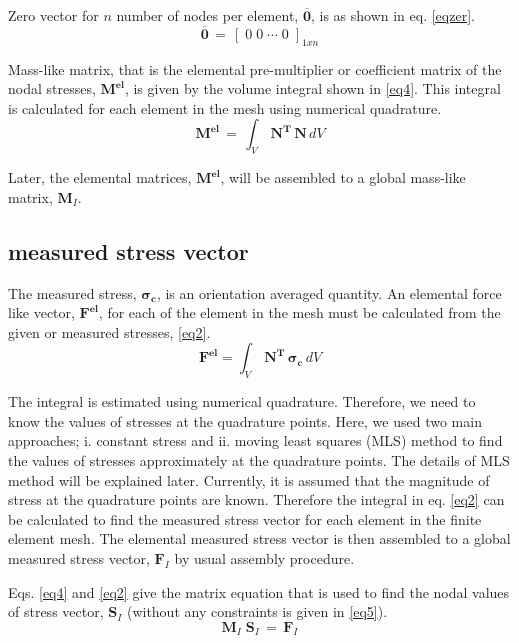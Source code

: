 \documentclass{article}
\begin{document}
Zero vector for $n$ number of nodes per element, $\mathbf{\mathbf{\overline{0}}}$, is as shown in eq. \eqref{eqzer}.
\begin{equation}
\mathbf{\mathbf{\overline{0}}} \,=\, \left[\; 0\; 0 \; \cdots\; 0\; \right]_{1xn}
\label{eqzer}
\end{equation}

Mass-like matrix, that is the elemental pre-multiplier or coefficient matrix of the nodal stresses, $\mathbf{M^{el}}$, is given by the volume integral shown in \eqref{eq4}. This integral is calculated for each element in the mesh using numerical quadrature.
\begin{equation}
\mathbf{M^{el}} \,=\, \int _V\, \mathbf{N^T}\, \mathbf{N}\, dV
\label{eq4}
\end{equation}

Later, the elemental matrices, $\mathbf{M^{el}}$, will be assembled to a global mass-like matrix, $\mathbf{M}_I$.
 

\subsection{measured stress vector}\label{sect2}

The measured stress, $\mathbf{\sigma_c}$, is an orientation averaged quantity. An elemental force like vector, $\mathbf{F^{el}}$, for each of the element in the mesh must be calculated from the given or measured stresses, \eqref{eq2}.
\begin{equation}
\mathbf{F^{el}} = \int _V\, \mathbf{N^T}\,  \mathbf{\sigma_c}  \, dV
\label{eq2}
\end{equation}

The integral is estimated using numerical quadrature. Therefore, we need to know the values of stresses at the quadrature points. Here, we used two main approaches; i. constant stress and ii. moving least squares (MLS) method to find the values of stresses approximately at the quadrature points. The details of MLS method will be explained later. Currently, it is assumed that the magnitude of stress at the quadrature points are known. Therefore the integral in eq. \eqref{eq2} can be calculated to find the measured stress vector for each element in the finite element mesh. The elemental measured stress vector is then assembled to a global measured stress vector, $\mathbf{F}_I$ by usual assembly procedure.

Eqs. \eqref{eq4} and \eqref{eq2} give the matrix equation that is used to find the nodal values of stress vector, $\mathbf{S}_I$ (without any constraints is given in \eqref{eq5}).
\begin{equation}
\mathbf{M}_I \; \mathbf{S}_I \,=\, \mathbf{F}_I
\label{eq5}
\end{equation}
\end{document}
